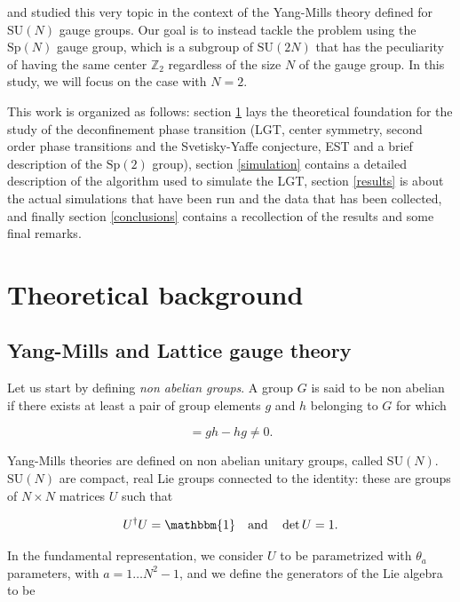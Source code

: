 \documentclass[reqno,12pt]{article}
\numberwithin{equation}{section}
\newcommand{\SU}{\mathrm{SU}}
\newcommand{\Sp}{\mathrm{Sp}}
\newcommand{\id}{\mathbbm{1}}
\begin{document}
\cite{caselle} and \cite{caristo} studied this very topic in the context of the Yang-Mills theory defined for $\SU(N)$
gauge groups. Our goal is to instead tackle the problem using the $\Sp(N)$ gauge group, which is a subgroup of $\SU(2N)$ that
has the peculiarity of having the same center $\mathbb{Z}_2$ regardless of the size $N$ of the gauge group. In this study, 
we will focus on the case with $N=2$. 

This work is organized as follows: section \ref{background} lays the theoretical foundation for the study of the 
deconfinement phase transition (LGT, center symmetry, second order phase transitions and the Svetisky-Yaffe conjecture,
EST and a brief description of the $\Sp(2)$ group), section \ref{simulation} contains a detailed description of the
algorithm used to simulate the LGT, section \ref{results} is about the actual simulations that have been run and the data that
has been collected, and finally section \ref{conclusions} contains a recollection of the results and some final remarks.

\newpage

\section{Theoretical background} \label{background}

\subsection{Yang-Mills and Lattice gauge theory} \label{lgt}

Let us start by defining \textit{non abelian groups}. A group $G$ is said to be non abelian if there exists at least
a pair of group elements $g$ and $h$ belonging to $G$ for which

\begin{equation}
	[g, h] = gh - hg \ne 0.
\end{equation}

Yang-Mills theories are defined on non abelian unitary groups, called $\SU(N)$. 
$\SU(N)$ are compact, real Lie groups connected to the identity: these are groups of $N \times N$ matrices $U$
such that

\begin{equation}
	U^\dagger U = \id \qq{and} \det U = 1.
\end{equation}

In the fundamental representation, we consider $U$ to be parametrized with $\theta_a$ parameters, 
with $a = 1 \dots N^2 - 1$, and we define the generators of the Lie algebra to be
\end{document}
